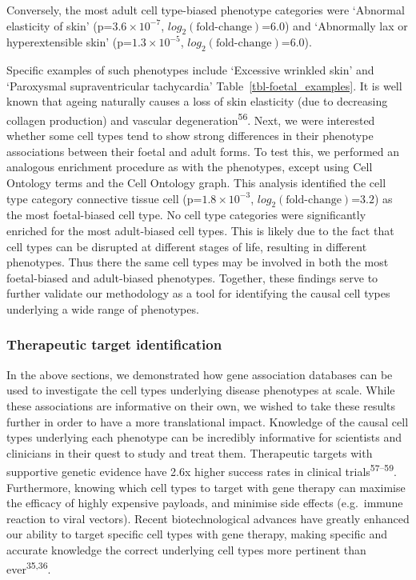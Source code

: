 \documentclass[
]{article}
\begin{document}
Conversely, the most adult cell type-biased phenotype categories were
`Abnormal elasticity of skin' (p=\(3.6 \times 10^{-7}\),
\(log_2(\text{fold-change})\)=\(6.0\)) and `Abnormally lax or
hyperextensible skin' (p=\(1.3 \times 10^{-5}\),
\(log_2(\text{fold-change})\)=\(6.0\)).

Specific examples of such phenotypes include `Excessive wrinkled skin'
and `Paroxysmal supraventricular tachycardia'
Table~\ref{tbl-foetal_examples}. It is well known that ageing naturally
causes a loss of skin elasticity (due to decreasing collagen production)
and vascular degeneration\textsuperscript{56}. Next, we were interested
whether some cell types tend to show strong differences in their
phenotype associations between their foetal and adult forms. To test
this, we performed an analogous enrichment procedure as with the
phenotypes, except using Cell Ontology terms and the Cell Ontology
graph. This analysis identified the cell type category connective tissue
cell (p=\(1.8 \times 10^{-3}\), \(log_2(\text{fold-change})\)=\(3.2\))
as the most foetal-biased cell type. No cell type categories were
significantly enriched for the most adult-biased cell types. This is
likely due to the fact that cell types can be disrupted at different
stages of life, resulting in different phenotypes. Thus there the same
cell types may be involved in both the most foetal-biased and
adult-biased phenotypes. Together, these findings serve to further
validate our methodology as a tool for identifying the causal cell types
underlying a wide range of phenotypes.

\subsubsection{Therapeutic target
identification}\label{therapeutic-target-identification}

In the above sections, we demonstrated how gene association databases
can be used to investigate the cell types underlying disease phenotypes
at scale. While these associations are informative on their own, we
wished to take these results further in order to have a more
translational impact. Knowledge of the causal cell types underlying each
phenotype can be incredibly informative for scientists and clinicians in
their quest to study and treat them. Therapeutic targets with supportive
genetic evidence have 2.6x higher success rates in clinical
trials\textsuperscript{57--59}. Furthermore, knowing which cell types to
target with gene therapy can maximise the efficacy of highly expensive
payloads, and minimise side effects (e.g.~immune reaction to viral
vectors). Recent biotechnological advances have greatly enhanced our
ability to target specific cell types with gene therapy, making specific
and accurate knowledge the correct underlying cell types more pertinent
than ever\textsuperscript{35,36}.
\end{document}
